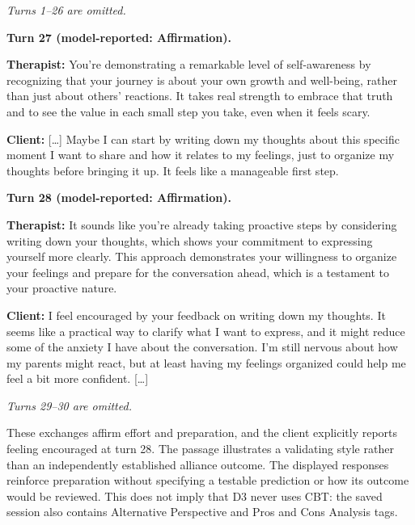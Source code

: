 \begin{tcolorbox}[breakable,colback=gray!5,colframe=gray!45,
    boxrule=0.5pt,arc=2mm,left=3mm,right=3mm,top=2mm,bottom=2mm,
    title={SFT+GRPO(D3): affirmation and client-reported encouragement} ,colbacktitle=gray!15,coltitle=black]
\small\linespread{1.15}\selectfont
\textit{Turns 1--26 are omitted.}\par\medskip
\textbf{Turn 27 (model-reported: Affirmation).}\par
\textbf{Therapist:} You’re demonstrating a remarkable level of self-awareness by recognizing that your journey is about your own growth and well-being, rather than just about others' reactions. It takes real strength to embrace that truth and to see the value in each small step you take, even when it feels scary.\par
\textbf{Client:} [\ldots] Maybe I can start by writing down my thoughts about this specific moment I want to share and how it relates to my feelings, just to organize my thoughts before bringing it up. It feels like a manageable first step.\par\medskip\textbf{Turn 28 (model-reported: Affirmation).}\par
\textbf{Therapist:} It sounds like you’re already taking proactive steps by considering writing down your thoughts, which shows your commitment to expressing yourself more clearly. This approach demonstrates your willingness to organize your feelings and prepare for the conversation ahead, which is a testament to your proactive nature.\par
\textbf{Client:} I feel encouraged by your feedback on writing down my thoughts. It seems like a practical way to clarify what I want to express, and it might reduce some of the anxiety I have about the conversation. I’m still nervous about how my parents might react, but at least having my feelings organized could help me feel a bit more confident. [\ldots]\par\medskip\textit{Turns 29--30 are omitted.}
\end{tcolorbox}

These exchanges affirm effort and preparation, and the client explicitly reports feeling encouraged at turn 28. The passage illustrates a validating style rather than an independently established alliance outcome. The displayed responses reinforce preparation without specifying a testable prediction or how its outcome would be reviewed. This does not imply that D3 never uses CBT: the saved session also contains Alternative Perspective and Pros and Cons Analysis tags.

